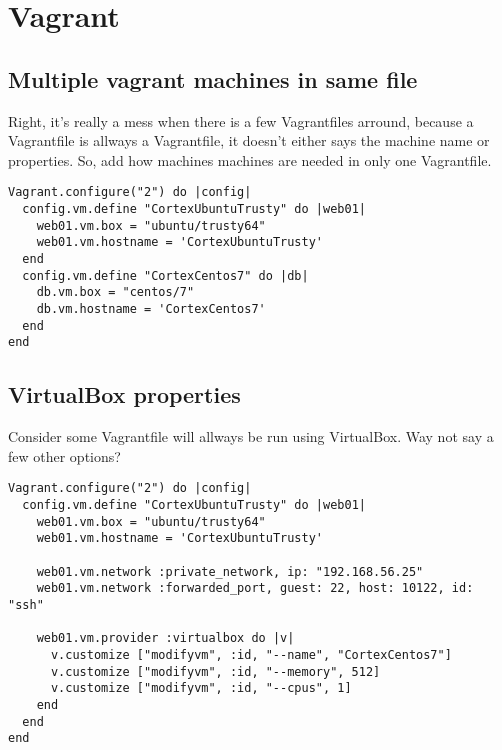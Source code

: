 \section{Vagrant}
\subsection{Multiple vagrant machines in same file}
Right, it's really a mess when there is a few Vagrantfiles arround, because a Vagrantfile is allways a Vagrantfile, it doesn't either says the machine name or properties. So, add how machines machines are needed in only one Vagrantfile.
\begin{lstlisting}
Vagrant.configure("2") do |config|
  config.vm.define "CortexUbuntuTrusty" do |web01|
    web01.vm.box = "ubuntu/trusty64"
    web01.vm.hostname = 'CortexUbuntuTrusty'
  end
  config.vm.define "CortexCentos7" do |db|
    db.vm.box = "centos/7"
    db.vm.hostname = 'CortexCentos7'
  end
end
\end{lstlisting}

\subsection{VirtualBox properties}
Consider some Vagrantfile will allways be run using VirtualBox. Way not say a few other options?
\begin{lstlisting}
Vagrant.configure("2") do |config|
  config.vm.define "CortexUbuntuTrusty" do |web01|
    web01.vm.box = "ubuntu/trusty64"
    web01.vm.hostname = 'CortexUbuntuTrusty'

    web01.vm.network :private_network, ip: "192.168.56.25"
    web01.vm.network :forwarded_port, guest: 22, host: 10122, id: "ssh"

    web01.vm.provider :virtualbox do |v|
      v.customize ["modifyvm", :id, "--name", "CortexCentos7"]
      v.customize ["modifyvm", :id, "--memory", 512]
      v.customize ["modifyvm", :id, "--cpus", 1]
    end
  end
end
\end{lstlisting}
